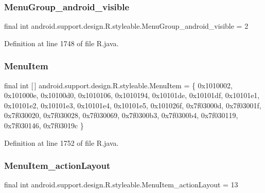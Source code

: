 \subsubsection{\texorpdfstring{MenuGroup\_android\_visible}{MenuGroup\_android\_visible}}
{\footnotesize\ttfamily final int android.\+support.\+design.\+R.\+styleable.\+Menu\+Group\+\_\+android\+\_\+visible = 2\hspace{0.3cm}{\ttfamily [static]}}



Definition at line 1748 of file R.\+java.

\mbox{\label{classandroid_1_1support_1_1design_1_1_r_1_1styleable_a4c90afdbb461f2bfba191da26fbc881c}} 
\subsubsection{\texorpdfstring{MenuItem}{MenuItem}}
{\footnotesize\ttfamily final int \mbox{[}$\,$\mbox{]} android.\+support.\+design.\+R.\+styleable.\+Menu\+Item = \{ 0x1010002, 0x101000e, 0x10100d0, 0x1010106, 0x1010194, 0x10101de, 0x10101df, 0x10101e1, 0x10101e2, 0x10101e3, 0x10101e4, 0x10101e5, 0x101026f, 0x7f03000d, 0x7f03001f, 0x7f030020, 0x7f030028, 0x7f030069, 0x7f0300b3, 0x7f0300b4, 0x7f030119, 0x7f030146, 0x7f03019c \}\hspace{0.3cm}{\ttfamily [static]}}



Definition at line 1752 of file R.\+java.

\mbox{\label{classandroid_1_1support_1_1design_1_1_r_1_1styleable_acea82da8f9d7bec29eb669375e904049}} 
\subsubsection{\texorpdfstring{MenuItem\_actionLayout}{MenuItem\_actionLayout}}
{\footnotesize\ttfamily final int android.\+support.\+design.\+R.\+styleable.\+Menu\+Item\+\_\+action\+Layout = 13\hspace{0.3cm}{\ttfamily [static]}}



